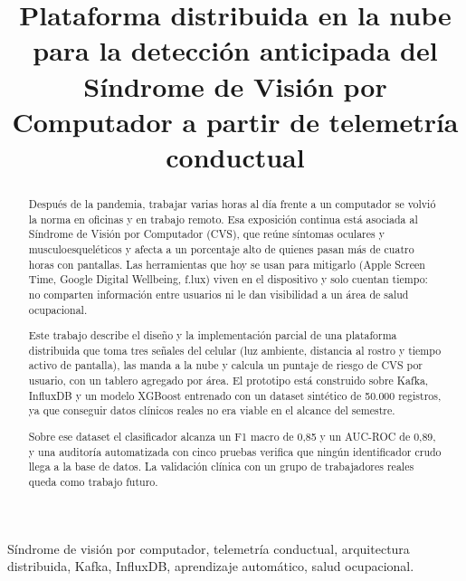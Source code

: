 \documentclass[conference]{IEEEtran}
\begin{document}
\title{Plataforma distribuida en la nube para la detección anticipada del Síndrome de Visión por Computador a partir de telemetría conductual}


\author{
}

\maketitle

\begin{abstract}
Después de la pandemia, trabajar varias horas al día frente a un computador
se volvió la norma en oficinas y en trabajo remoto. Esa exposición continua
está asociada al Síndrome de Visión por Computador (CVS), que reúne
síntomas oculares y musculoesqueléticos y afecta a un porcentaje alto
de quienes pasan más de cuatro horas con pantallas. Las herramientas que
hoy se usan para mitigarlo (Apple Screen Time, Google Digital Wellbeing,
f.lux) viven en el dispositivo y solo cuentan tiempo: no comparten
información entre usuarios ni le dan visibilidad a un área de salud
ocupacional.

Este trabajo describe el diseño y la implementación parcial de una
plataforma distribuida que toma tres señales del celular (luz ambiente,
distancia al rostro y tiempo activo de pantalla), las manda a la nube y
calcula un puntaje de riesgo de CVS por usuario, con un tablero agregado
por área. El prototipo está construido sobre Kafka, InfluxDB y un modelo
XGBoost entrenado con un dataset sintético de 50.000 registros, ya que
conseguir datos clínicos reales no era viable en el alcance del semestre. 

Sobre ese dataset el clasificador alcanza un F1 macro de
0{,}85 y un AUC-ROC de 0{,}89, y una auditoría automatizada con cinco
pruebas verifica que ningún identificador crudo llega a la base de datos.
La validación clínica con un grupo de trabajadores reales queda como
trabajo futuro.
\end{abstract}

\begin{IEEEkeywords}
Síndrome de visión por computador, telemetría conductual, arquitectura
distribuida, Kafka, InfluxDB, aprendizaje automático, salud ocupacional.
\end{IEEEkeywords}
\end{document}
